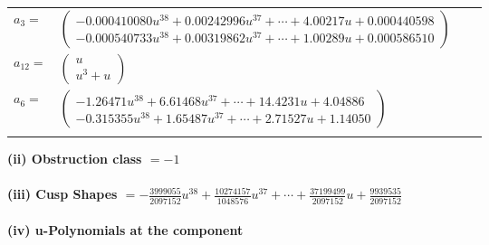 \documentclass[1p]{elsarticle_modified}
\theoremstyle{definition}
\begin{document}
\begin{tabular}{m{7pt} m{180pt} m{7pt} m{180pt} }
\flushright $a_{3}=$&$\begin{pmatrix}-0.000410080 u^{38}+0.00242996 u^{37}+\cdots+4.00217 u+0.000440598\\-0.000540733 u^{38}+0.00319862 u^{37}+\cdots+1.00289 u+0.000586510\end{pmatrix}$ \\
\flushright $a_{12}=$&$\begin{pmatrix}u\\u^3+u\end{pmatrix}$ \\
\flushright $a_{6}=$&$\begin{pmatrix}-1.26471 u^{38}+6.61468 u^{37}+\cdots+14.4231 u+4.04886\\-0.315355 u^{38}+1.65487 u^{37}+\cdots+2.71527 u+1.14050\end{pmatrix}$\\&\end{tabular}
\flushleft \textbf{(ii) Obstruction class $= -1$}\\~\\
\flushleft \textbf{(iii) Cusp Shapes $= -\frac{3999055}{2097152} u^{38}+\frac{10274157}{1048576} u^{37}+\cdots+\frac{37199499}{2097152} u+\frac{9939535}{2097152}$}\\~\\
\newpage\renewcommand{\arraystretch}{1}
\flushleft \textbf{(iv) u-Polynomials at the component}\newline \\
\end{document}
